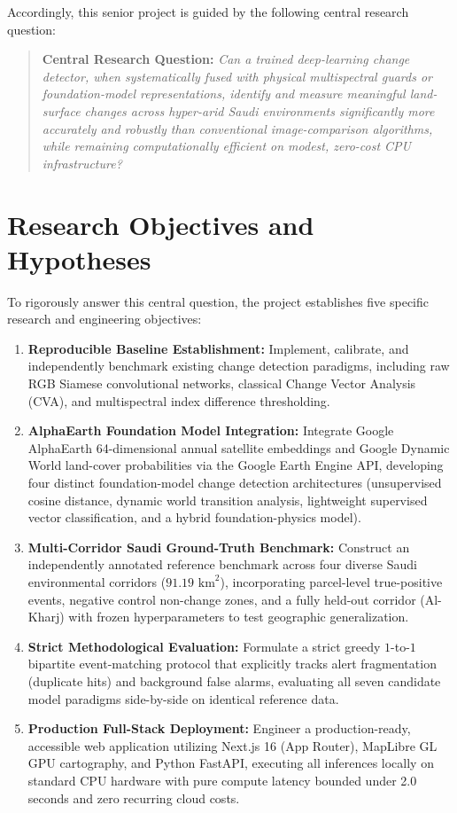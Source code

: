 Accordingly, this senior project is guided by the following central research question:

\begin{quote}
\textbf{Central Research Question:} \textit{Can a trained deep-learning change detector, when systematically fused with physical multispectral guards or foundation-model representations, identify and measure meaningful land-surface changes across hyper-arid Saudi environments significantly more accurately and robustly than conventional image-comparison algorithms, while remaining computationally efficient on modest, zero-cost CPU infrastructure?}
\end{quote}

\section{Research Objectives and Hypotheses}
\label{sec:intro_objectives}
To rigorously answer this central question, the project establishes five specific research and engineering objectives:

\begin{enumerate}
    \item \textbf{Reproducible Baseline Establishment:} Implement, calibrate, and independently benchmark existing change detection paradigms, including raw RGB Siamese convolutional networks, classical Change Vector Analysis (CVA), and multispectral index difference thresholding.
    \item \textbf{AlphaEarth Foundation Model Integration:} Integrate Google AlphaEarth 64-dimensional annual satellite embeddings and Google Dynamic World land-cover probabilities via the Google Earth Engine API, developing four distinct foundation-model change detection architectures (unsupervised cosine distance, dynamic world transition analysis, lightweight supervised vector classification, and a hybrid foundation-physics model).
    \item \textbf{Multi-Corridor Saudi Ground-Truth Benchmark:} Construct an independently annotated reference benchmark across four diverse Saudi environmental corridors ($91.19\text{ km}^2$), incorporating parcel-level true-positive events, negative control non-change zones, and a fully held-out corridor (Al-Kharj) with frozen hyperparameters to test geographic generalization.
    \item \textbf{Strict Methodological Evaluation:} Formulate a strict greedy $1$-to-$1$ bipartite event-matching protocol that explicitly tracks alert fragmentation (duplicate hits) and background false alarms, evaluating all seven candidate model paradigms side-by-side on identical reference data.
    \item \textbf{Production Full-Stack Deployment:} Engineer a production-ready, accessible web application utilizing Next.js 16 (App Router), MapLibre GL GPU cartography, and Python FastAPI, executing all inferences locally on standard CPU hardware with pure compute latency bounded under 2.0 seconds and zero recurring cloud costs.
\end{enumerate}

